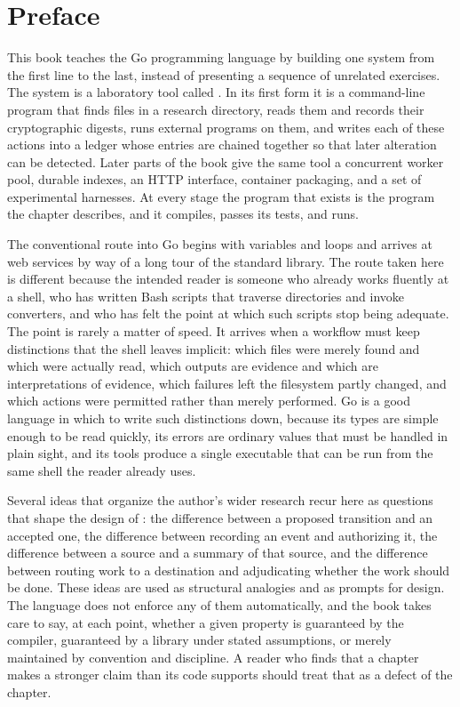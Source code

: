 \chapter{Preface}

This book teaches the Go programming language by building one system from the first line to the last, instead of presenting a sequence of unrelated exercises. The system is a laboratory tool called \golab{}. In its first form it is a command-line program that finds files in a research directory, reads them and records their cryptographic digests, runs external programs on them, and writes each of these actions into a ledger whose entries are chained together so that later alteration can be detected. Later parts of the book give the same tool a concurrent worker pool, durable indexes, an HTTP interface, container packaging, and a set of experimental harnesses. At every stage the program that exists is the program the chapter describes, and it compiles, passes its tests, and runs.

The conventional route into Go begins with variables and loops and arrives at web services by way of a long tour of the standard library. The route taken here is different because the intended reader is someone who already works fluently at a shell, who has written Bash scripts that traverse directories and invoke converters, and who has felt the point at which such scripts stop being adequate. The point is rarely a matter of speed. It arrives when a workflow must keep distinctions that the shell leaves implicit: which files were merely found and which were actually read, which outputs are evidence and which are interpretations of evidence, which failures left the filesystem partly changed, and which actions were permitted rather than merely performed. Go is a good language in which to write such distinctions down, because its types are simple enough to be read quickly, its errors are ordinary values that must be handled in plain sight, and its tools produce a single executable that can be run from the same shell the reader already uses.

Several ideas that organize the author's wider research recur here as questions that shape the design of \golab{}: the difference between a proposed transition and an accepted one, the difference between recording an event and authorizing it, the difference between a source and a summary of that source, and the difference between routing work to a destination and adjudicating whether the work should be done. These ideas are used as structural analogies and as prompts for design. The language does not enforce any of them automatically, and the book takes care to say, at each point, whether a given property is guaranteed by the compiler, guaranteed by a library under stated assumptions, or merely maintained by convention and discipline. A reader who finds that a chapter makes a stronger claim than its code supports should treat that as a defect of the chapter.

